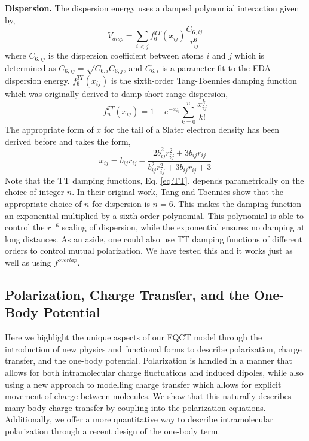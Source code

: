 \documentclass[journal=jctcce,manuscript=article]{achemso}
\begin{document}
\textbf{Dispersion.} The dispersion energy uses a damped
polynomial interaction given by,
\begin{equation}
  V_{disp}=\sum_{i<j}f_6^{TT}(x_{ij})\frac{C_{6,ij}}{r_{ij}^6}
  \label{eq:disp}
\end{equation}
\noindent
where $C_{6,ij}$ is the dispersion coefficient between atoms
$i$ and $j$ which is determined as $C_{6,ij}=\sqrt{C_{6,i}C_{6,j}}$, and $C_{6,i}$ is
a parameter fit to the EDA dispersion energy. $f_6^{TT}(x_{ij})$ is the sixth-order
Tang-Toennies damping function\cite{tang1984improved} which was originally derived
to damp short-range dispersion,
\begin{equation}
  f_n^{TT}(x_{ij}) = 1-e^{-x_{ij}}\sum_{k=0}^n\frac{x_{ij}^k}{k!}
  \label{eq:TT}
\end{equation}
The appropriate form of $x$ for the tail of a Slater electron density has been derived before\cite{van2016beyond} and takes the form,
\begin{equation}
  x_{ij}=b_{ij}r_{ij}-\frac{2b_{ij}^2r_{ij}^2+3b_{ij}r_{ij}}{b_{ij}^2r_{ij}^2+3b_{ij}r_{ij}+3}
  \label{eq:TT_x}
\end{equation}
Note that the TT damping functions, Eq. \ref{eq:TT}, depends parametrically on the choice of integer $n$. In their original work, Tang and Toennies show that the appropriate choice of $n$ for dispersion is $n=6$. This makes the damping function an exponential multiplied by a sixth order polynomial. This polynomial is able to control the $r^{-6}$ scaling of dispersion, while the exponential ensures no damping at long distances. As an aside, one could also use TT damping functions of different orders to control mutual polarization. We have tested this and it works just as well as using $f^{overlap}$.

\subsection*{Polarization, Charge Transfer, and the One-Body Potential}
Here we highlight the unique aspects of our FQCT model through the introduction of new physics and functional forms to describe polarization, charge transfer, and the one-body potential. Polarization is handled in a manner that allows for both intramolecular charge fluctuations and induced dipoles, while also using a new approach to modelling charge transfer which allows for explicit movement of charge between molecules. We show that this naturally describes many-body charge transfer by coupling into the polarization equations. Additionally, we offer a more quantitative way to describe intramolecular polarization through a recent design of the one-body term.
\end{document}

